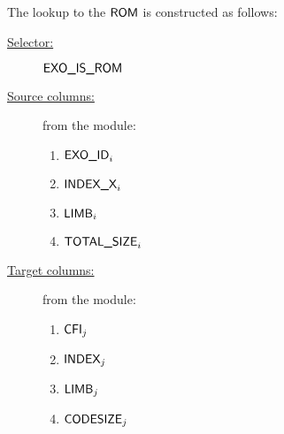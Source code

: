 The lookup to the $\textsf{ROM}$ is constructed as follows:
\begin{description}
	\item[\underline{Selector:}] $\textsf{EXO\_IS\_ROM}$
	\item[\underline{Source columns:}] from the \mmioMod{} module:
		\begin{multicols}{3}
			\begin{enumerate}
				\item $\textsf{EXO\_ID}_{i}$
				\item $\textsf{INDEX\_X}_{i}$
				\item $\textsf{LIMB}_{i}$
				\item $\textsf{TOTAL\_SIZE}_{i}$
			\end{enumerate}
		\end{multicols}
	\item[\underline{Target columns:}] from the \romMod{} module: 
		\begin{multicols}{3}
			\begin{enumerate}
				\item $\textsf{CFI}_{j}$
				\item $\textsf{INDEX}_{j}$
				\item $\textsf{LIMB}_{j}$
				\item $\textsf{CODESIZE}_{j}$
			\end{enumerate}
		\end{multicols}
\end{description}
